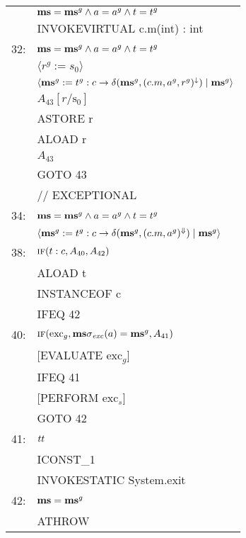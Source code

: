\documentclass[10pt,twocolumn]{article}
\newcommand{\AND}{\wedge}
\newcommand{\IF}{\mbox{\sc if}}
\newcommand{\MS}{{\bf ms}}
\newcommand{\True}{\mbox{\it tt}}
\newcommand{\Stack}{\mathrm{s}}
\begin{document}
\begin{figure}
{\begin{center}
\begin{tabular}{@{}l@{~}l@{}}
        & $\MS = \MS^g \AND a = a^g \AND t = t^g $ \\
        & INVOKEVIRTUAL c.m(int) : int \\[\sep]
        
32:     & $\MS = \MS^g \AND a = a^g \AND t = t^g $ \\
        & $ \langle r^g := s_0 \rangle$ \\
        & $ \langle \MS^g := t^g : c \rightarrow \delta(\MS^g, (c.m, a^g, r^g)^\downarrow) \mid \MS^g \rangle$ \\[\sep]
        
        & $A_{43}[r/\Stack_0]$ \\
        & ASTORE r \\
        & ALOAD r \\[\sep]
        
        & $A_{43}$ \\
        & GOTO 43 \\[\sep]

        & // EXCEPTIONAL \\[\sep]

34:     & $\MS = \MS^g \AND a = a^g \AND t = t^g $ \\
        & $ \langle \MS^g := t^g:c \rightarrow \delta(\MS^g, (c.m, a^g)^\Downarrow) \mid \MS^g \rangle$ \\[\sep]
        
38:     & $\IF(t : c, A_{40}, A_{42})$ \\
        & ALOAD t \\
        & INSTANCEOF c \\
        & IFEQ 42 \\[\sep]

40:     & $\IF(\mbox{exc}_g, \MS\sigma_{\it exc}(a) = \MS^g, A_{41})$ \\
        & [EVALUATE exc$_g$] \\
        & IFEQ 41 \\
        & [PERFORM exc$_s$] \\
        & GOTO 42 \\[\sep]

41:     & $\True$ \\
        & ICONST\_1 \\
        & INVOKESTATIC System.exit \\[\sep]

42:     & $\MS = \MS^g$ \\
        & ATHROW \\[\sep]


\end{tabular}
\end{center}}
\end{figure}
\end{document}
